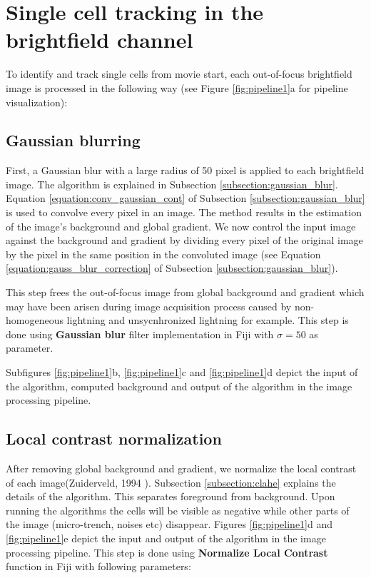 \documentclass[pdftex,12pt,a4paper]{report}
\begin{document}
\section{Single cell tracking in the brightfield channel}
\label{section:pipeline_brightfield}

To identify and track single cells from movie start, each out-of-focus brightfield image is processed in the following way (see Figure \ref{fig:pipeline1}a for pipeline visualization): 

\subsection{Gaussian blurring}

First, a Gaussian blur  with a large radius of 50 pixel is applied to each brightfield image. The algorithm is explained in Subsection \ref{subsection:gaussian_blur}. Equation \ref{equation:conv_gaussian_cont} of Subsection \ref{subsection:gaussian_blur} is used to convolve every pixel in an image. The method results in the estimation of the image's background and global gradient. We now control the input image against the background and gradient by dividing every pixel of the original image by the pixel in the same position in the convoluted image (see Equation \ref{equation:gauss_blur_correction} of Subsection \ref{subsection:gaussian_blur}).

This step frees the out-of-focus image from global background and gradient which may have been arisen during image acquisition process caused by non-homogeneous lightning and unsycnhronized lightning for example. This step is done using \textbf{Gaussian blur} filter implementation in Fiji with $\sigma = 50$ as parameter.

Subfigures \ref{fig:pipeline1}b, \ref{fig:pipeline1}c and \ref{fig:pipeline1}d depict the input of the algorithm, computed background and output of the algorithm in the image processing pipeline.

\subsection{Local contrast normalization}

After removing global background and gradient, we normalize the local contrast of each image(Zuiderveld, 1994  \cite{zuiderveld1994contrast}). Subsection \ref{subsection:clahe} explains the details of  the algorithm. This separates foreground from background. Upon running the algorithms the cells will be visible as negative while other parts of the image (micro-trench, noises etc) disappear. Figures \ref{fig:pipeline1}d and \ref{fig:pipeline1}e depict the input and output of the algorithm in the image processing pipeline. This step is done using \textbf{Normalize Local Contrast} function in Fiji with following parameters:
\end{document}
